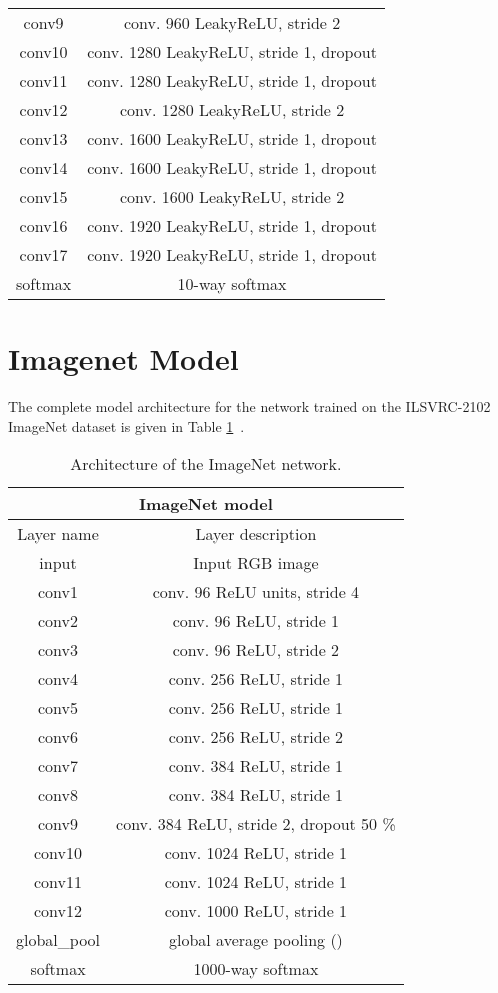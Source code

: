 \documentclass{article} \usepackage{iclr2015,times}
\begin{document}
\begin{appendix}
\begin{table}[h]
\begin{center}
\begin{tabular}{c|c}
conv9 &  conv. 960 LeakyReLU, stride 2 \\
conv10 &  conv. 1280 LeakyReLU, stride 1, dropout \\
conv11 &  conv. 1280 LeakyReLU, stride 1, dropout \\
conv12 &  conv. 1280 LeakyReLU, stride 2 \\
conv13 &  conv. 1600 LeakyReLU, stride 1, dropout \\
conv14 &  conv. 1600 LeakyReLU, stride 1, dropout \\
conv15 &  conv. 1600 LeakyReLU, stride 2 \\
conv16 &  conv. 1920 LeakyReLU, stride 1, dropout \\
conv17 &  conv. 1920 LeakyReLU, stride 1, dropout \\
softmax & 10-way softmax
\end{tabular}
\end{center}
\end{table}


\section{Imagenet Model}
The complete model architecture for the network trained on the ILSVRC-2102 ImageNet dataset is given in Table \ref{tbl:imagenet_net}~.
\newpage
\begin{table}[ht]
\caption{Architecture of the ImageNet network.}
\label{tbl:imagenet_net}
\begin{center}
\begin{tabular}{c|c}
\multicolumn{2}{c}{\textbf{ImageNet model}} \\ \hline
Layer name & Layer description \\ \hline
input & Input  RGB image\\
conv1 &  conv. 96 ReLU units, stride 4\\
conv2 &  conv. 96 ReLU, stride 1\\
conv3 &  conv. 96 ReLU, stride 2\\
conv4 &  conv. 256 ReLU, stride 1\\
conv5 &  conv. 256 ReLU, stride 1\\
conv6 &  conv. 256 ReLU, stride 2\\
conv7 &  conv. 384 ReLU, stride 1\\
conv8 &  conv. 384 ReLU, stride 1\\
conv9 &  conv. 384 ReLU, stride 2, dropout 50 \%\\
conv10 &  conv. 1024 ReLU, stride 1\\
conv11 &  conv. 1024 ReLU, stride 1\\
conv12 &  conv. 1000 ReLU, stride 1\\
global\_pool & global average pooling ()\\
softmax & 1000-way softmax
\end{tabular}
\end{center}
\end{table}


\end{appendix}
\end{document}
